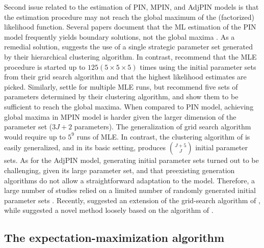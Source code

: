 Second issue related to the estimation of PIN, MPIN, and AdjPIN models is that the estimation procedure may not reach the global maximum of the (factorized) likelihood function. Several papers document that the ML estimation of the PIN model frequently yields boundary solutions, not the global maxima \citep{Yan2012improved,Gan2015faster,Ersan2016unbiased}. As a remedial solution, \cite{Gan2015faster} suggests the use of a single strategic parameter set generated by their hierarchical clustering algorithm. In contrast, \cite{Yan2012improved} recommend that the MLE procedure is started up to \(125\left(5\times 5\times 5\right)\) times using the initial parameter sets from their grid search algorithm and that the highest likelihood estimates are picked. Similarly, \cite{Ersan2016unbiased} settle for multiple MLE runs, but recommend five sets of parameters determined by their clustering algorithm, and show them to be sufficient to reach the global maxima. When compared to PIN model, achieving global maxima in MPIN model is harder given the larger dimension of the parameter set (\(3J+2\) parameters). The generalization of \cite{Yan2012improved} grid search algorithm would require up to  \(5^{9}\) runs of MLE. In contrast, the clustering algorithm of \cite{Ersan2016unbiased} is easily generalized, and in its basic setting, produces \(\binom{J + 5}{J}\) initial parameter sets. As for the AdjPIN model, generating initial parameter sets turned out to be challenging, given its large parameter set, and that preexisting generation algorithms do not allow a straightforward adaptation to the model. Therefore, a large number of studies relied on a limited number of randomly generated initial parameter sets \citep[see e.g.][]{duarte2009why}. Recently, \cite{cheng2021improvements} suggested an extension of the grid-search algorithm of \cite{Yan2012improved}, while \cite{Ersan2022methodological} suggested a novel method loosely based on the  algorithm of \cite{Ersan2016unbiased}. 

\subsection{The expectation-maximization algorithm}

